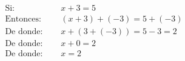 \documentclass{article}
\begin{document}
	
	\begin{align*}
		\text{Si: } & \quad x + 3 = 5 \\
		\text{Entonces: } & \quad (x + 3) + (-3) = 5 + (-3) \\
		\text{De donde: } & \quad x + (3 + (-3)) = 5 - 3 = 2 \\
		\text{De donde: } & \quad x + 0 = 2 \\
		\text{De donde: } & \quad x = 2
	\end{align*}
	
\end{document}
